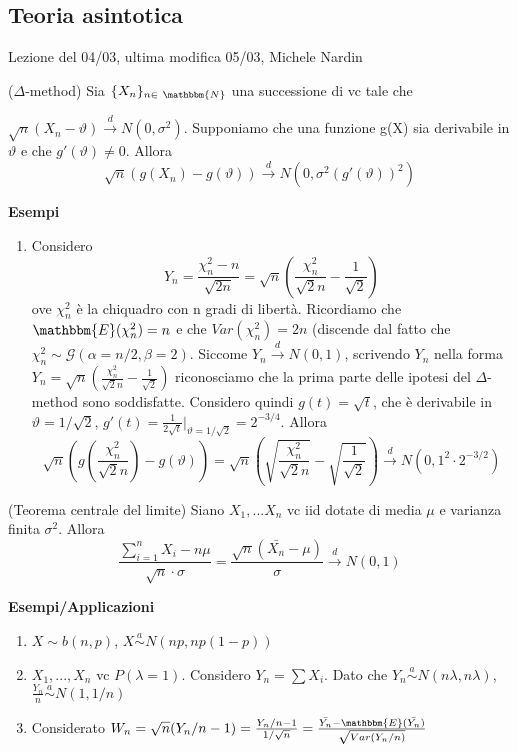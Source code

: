 \subsection{Teoria asintotica}
Lezione del 04/03, ultima modifica 05/03, Michele Nardin

\begin{teo}
\noindent
($\Delta$-method) Sia $\{X_n\}_{n \in\ \mathbbm{N}}$ una successione di vc
tale che 

\noindent $\sqrt{n}(X_n-\vartheta)\stackrel{d}{\rightarrow}N(0,\sigma^2)$. 
Supponiamo che una funzione g(X) sia derivabile in $\vartheta$ e che $g'(\vartheta)\neq0$. Allora $$\sqrt{n}(g(X_n)-g(\vartheta))\stackrel{d}{\rightarrow}N(0,\sigma^2(g'(\vartheta))^2)$$
\end{teo}

\textbf{Esempi}
\begin{enumerate}
\item Considero $$Y_n=\frac{\chi^2_n-n}{\sqrt{2n}}=\sqrt{n}\left(\frac{\chi^2_n}{\sqrt{2}n}-\frac{1}{\sqrt{2}}\right)$$ ove $\chi^2_n$ è la chiquadro con n gradi di libertà. 
Ricordiamo che $\mathbbm{E}(\chi^2_n)=n$ e che $Var(\chi^2_n)=2n$ (discende dal fatto che $\chi^2_n \sim \mathcal{G}(\alpha=n/2,\beta=2)$. 
Siccome $Y_n \stackrel{d}{\rightarrow} N(0,1)$, scrivendo $Y_n$ nella forma $Y_n=\sqrt{n}\left(\frac{\chi^2_n}{\sqrt{2}n}-\frac{1}{\sqrt{2}}\right)$ riconosciamo che la prima parte delle ipotesi del $\Delta$-method sono soddisfatte.
Considero quindi $g(t)=\sqrt{t}$, che è derivabile in $\vartheta=1/\sqrt{2}$, $g'(t)=\frac{1}{2\sqrt{t}}|_{\vartheta=1/\sqrt{2}}=2^{-3/4}$.
Allora $$\sqrt{n}(g\left(\frac{\chi^2_n}{\sqrt{2}n}\right)-g(\vartheta))=
\sqrt{n}\left(\sqrt{\frac{\chi^2_n}{\sqrt{2}n}}-\sqrt{\frac{1}{\sqrt{2}}}\right)
\stackrel{d}{\rightarrow}N(0,1^2\cdot 2^{-3/2})$$
\end{enumerate}

\begin{teo}
(Teorema centrale del limite) Siano $X_1,...X_n$ vc iid dotate di media $\mu$ e varianza finita $\sigma^2$. Allora 
$$\frac{\sum_{i=1}^n X_i - n\mu}{\sqrt{n}\cdot \sigma} = \frac{\sqrt{n}(\bar{X_n}-\mu)}{\sigma}\stackrel{d}{\rightarrow}N(0,1) $$
\end{teo}

\textbf{Esempi/Applicazioni}
\begin{enumerate}
\item $X \sim b(n,p)$, $X \stackrel{a}{\sim}N(np,np(1-p))$
\item $X_1,...,X_n$ vc 
$P(\lambda =1)$. 
Considero $Y_n=\sum X_i$.
Dato che $Y_n \stackrel{a}
{\sim} N(n\lambda ,n \lambda )$,
 $\frac{Y_n}{n} \stackrel{a}
 {\sim} N(1,1/n)$
\item Considerato $W_n=\sqrt{n}(Y_n/n-1)=\frac{Y_n/n-1}
{1/\sqrt{n}}=\frac{\bar{Y_n} - \mathbbm{E}(\bar{Y_n})}
{\sqrt{Var(Y_n/n)}}$
\end{enumerate}

